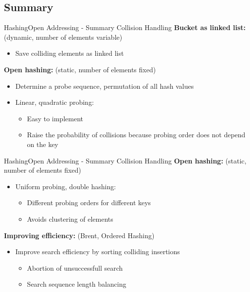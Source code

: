 
\subsection{Summary}

\begin{frame}{Hashing}{Open Addressing - Summary Collision Handling}
  \textbf{Bucket as linked list:}
  {\color{MainA}(dynamic, number of elements variable)}
  \begin{itemize}
    \item
      Save colliding elements as linked list
  \end{itemize}
  \vspace{1.0em}
  \textbf{Open hashing:}
  {\color{MainA}(static, number of elements fixed)}
  \begin{itemize}
    \item
      Determine a probe sequence, permutation of all hash values
    \item
      Linear, quadratic probing:
      \begin{itemize}
        \item
          Easy to implement
        \item
          Raise the probability of collisions because probing order does
          not depend on the key
      \end{itemize}
  \end{itemize}
\end{frame}


\begin{frame}{Hashing}{Open Addressing - Summary Collision Handling}
  \textbf{Open hashing:}
         {\color{MainA}(static, number of elements fixed)}
  \begin{itemize}
    \item
      Uniform probing, double hashing:
      \begin{itemize}
        \item
          Different probing orders for different keys
        \item
          Avoids clustering of elements
      \end{itemize}
  \end{itemize}
  \vspace{1.0em}
  \textbf{Improving efficiency:}
  {\color{MainA}(Brent, Ordered Hashing)}
  \begin{itemize}
    \item
      Improve search efficiency by sorting colliding insertions
      \begin{itemize}
        \item
          Abortion of unsuccessfull search
        \item
          Search sequence length balancing
      \end{itemize}
  \end{itemize}
\end{frame}

